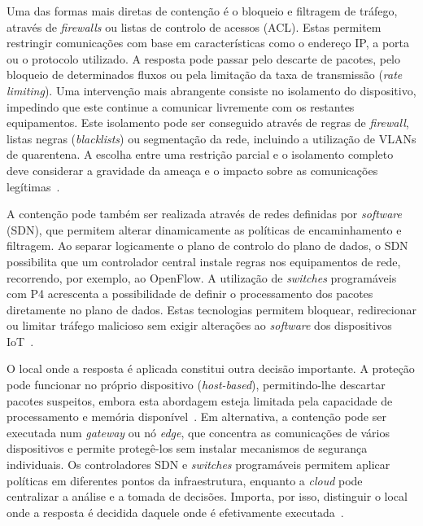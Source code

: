 \documentclass[conference,a4paper]{IEEEtran}
\begin{document}
Uma das formas mais diretas de contenção é o bloqueio e filtragem de tráfego, através de \textit{firewalls} ou listas de controlo de acessos (ACL). Estas permitem restringir comunicações com base em características como o endereço IP, a porta ou o protocolo utilizado. A resposta pode passar pelo descarte de pacotes, pelo bloqueio de determinados fluxos ou pela limitação da taxa de transmissão (\textit{rate limiting}). Uma intervenção mais abrangente consiste no isolamento do dispositivo, impedindo que este continue a comunicar livremente com os restantes equipamentos. Este isolamento pode ser conseguido através de regras de \textit{firewall}, listas negras (\textit{blacklists}) ou segmentação da rede, incluindo a utilização de VLANs de quarentena. A escolha entre uma restrição parcial e o isolamento completo deve considerar a gravidade da ameaça e o impacto sobre as comunicações legítimas~\cite{rose2022ideres,karibandi2025cyberdome,hunde2026rankshield}.

A contenção pode também ser realizada através de redes definidas por \textit{software} (SDN), que permitem alterar dinamicamente as políticas de encaminhamento e filtragem. Ao separar logicamente o plano de controlo do plano de dados, o SDN possibilita que um controlador central instale regras nos equipamentos de rede, recorrendo, por exemplo, ao OpenFlow. A utilização de \textit{switches} programáveis com P4 acrescenta a possibilidade de definir o processamento dos pacotes diretamente no plano de dados. Estas tecnologias permitem bloquear, redirecionar ou limitar tráfego malicioso sem exigir alterações ao \textit{software} dos dispositivos IoT~\cite{elsayed2024mpguard}.

O local onde a resposta é aplicada constitui outra decisão importante. A proteção pode funcionar no próprio dispositivo (\textit{host-based}), permitindo-lhe descartar pacotes suspeitos, embora esta abordagem esteja limitada pela capacidade de processamento e memória disponível~\cite{kponyo2020lightweight}. Em alternativa, a contenção pode ser executada num \textit{gateway} ou nó \textit{edge}, que concentra as comunicações de vários dispositivos e permite protegê-los sem instalar mecanismos de segurança individuais. Os controladores SDN e \textit{switches} programáveis permitem aplicar políticas em diferentes pontos da infraestrutura, enquanto a \textit{cloud} pode centralizar a análise e a tomada de decisões. Importa, por isso, distinguir o local onde a resposta é decidida daquele onde é efetivamente executada~\cite{elsayed2024mpguard,karibandi2025cyberdome}.
\end{document}
